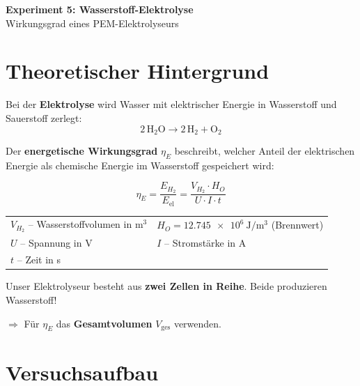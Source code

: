 \documentclass[11pt,a4paper]{scrartcl}
\begin{document}
	
	\begin{center}
		{\LARGE\bfseries Experiment 5: Wasserstoff-Elektrolyse}\\[0.5cm]
		{\large Wirkungsgrad eines PEM-Elektrolyseurs}
	\end{center}
	
	\vspace{0.5cm}
	
	\section*{Theoretischer Hintergrund}
	
	Bei der \textbf{Elektrolyse} wird Wasser mit elektrischer Energie in Wasserstoff und Sauerstoff zerlegt:
	\[2\,\text{H}_2\text{O} \longrightarrow 2\,\text{H}_2 + \text{O}_2\]
	
	Der \textbf{energetische Wirkungsgrad} $\eta_E$ beschreibt, welcher Anteil der elektrischen Energie als chemische Energie im Wasserstoff gespeichert wird:
	
	\begin{formelbox}[title={\faIcon{square-root-alt} Energetischer Wirkungsgrad}]
		\[\eta_E = \frac{E_{H_2}}{E_{\text{el}}} = \frac{V_{H_2} \cdot H_O}{U \cdot I \cdot t}\]
		
		\begin{tabular}{ll}
			$V_{H_2}$ -- Wasserstoffvolumen in m$^3$ & $H_O = \SI{12,745e6}{\joule\per\cubic\metre}$ (Brennwert) \\
			$U$ -- Spannung in V & $I$ -- Stromstärke in A \\
			$t$ -- Zeit in s &
		\end{tabular}
	\end{formelbox}
	
	\begin{hilfebox}[title={\faIcon{lightbulb} Doppelelektrolyseur}]
		Unser Elektrolyseur besteht aus \textbf{zwei Zellen in Reihe}. Beide produzieren Wasserstoff!
		
		$\Rightarrow$ Für $\eta_E$ das \textbf{Gesamtvolumen} $V_{\text{ges}}$ verwenden.
	\end{hilfebox}
	
	\section*{Versuchsaufbau}
	
\end{document}
